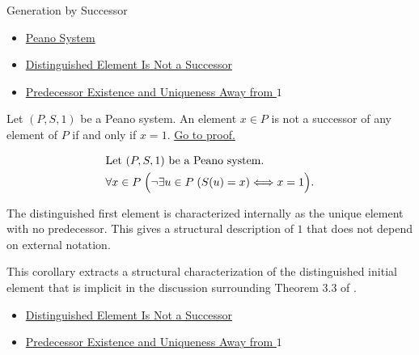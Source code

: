 \begin{topicbox}{Generation by Successor}
\begin{remark*}[Dependencies]
\begin{itemize}
  \item \hyperref[def:peano-system]{Peano System}
  \item \hyperref[ax:peano-one-not-successor]{Distinguished Element Is Not a Successor}
  \item \hyperref[cor:predecessor-exists-unique-away-from-one]{Predecessor Existence and Uniqueness Away from $1$}
\end{itemize}
\end{remark*}

\begin{tcolorbox}[colback=corbox, colframe=corborder, arc=2pt,
  left=6pt, right=6pt, top=4pt, bottom=4pt,
  title={\small\textbf{Corollary (The Distinguished Element Is the Unique Non-Successor)}} ,
  fonttitle=\small\bfseries]
\begin{corollary}
\label{cor:one-is-unique-non-successor}
Let $(P,S,1)$ be a Peano system. An element $x \in P$ is not a successor of
any element of $P$ if and only if $x=1$.
\hyperref[prf:one-is-unique-non-successor]{Go to proof.}
\end{corollary}
\end{tcolorbox}

\begin{remark*}
\[
\begin{aligned}
&\text{Let } (P,S,1) \text{ be a Peano system.}\\
&\forall x \in P\;\Bigl(\neg\exists u \in P\;(S(u)=x) \Longleftrightarrow x=1\Bigr).
\end{aligned}
\]
\end{remark*}

\begin{remark*}[Interpretation]
The distinguished first element is characterized internally as the unique
element with no predecessor. This gives a structural description of $1$ that
does not depend on external notation.
\end{remark*}

\begin{remark*}
This corollary extracts a structural characterization of the distinguished
initial element that is implicit in the discussion surrounding Theorem 3.3 of
\citet{FefermanNumberSystems1964}.
\end{remark*}

\begin{remark*}[Dependencies]
\begin{itemize}
  \item \hyperref[ax:peano-one-not-successor]{Distinguished Element Is Not a Successor}
  \item \hyperref[cor:predecessor-exists-unique-away-from-one]{Predecessor Existence and Uniqueness Away from $1$}
\end{itemize}
\end{remark*}


\end{topicbox}
